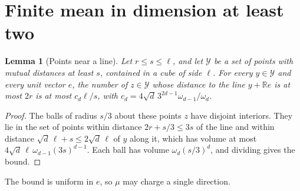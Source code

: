 \documentclass[11pt,a4paper]{article}
\numberwithin{equation}{section}
\newtheorem{lemma}[theorem]{Lemma}
\theoremstyle{definition}
\theoremstyle{remark}
\newcommand{\R}{\mathbb R}
\begin{document}
\section{Finite mean in dimension at least two}\label{sec:finite}

\begin{lemma}[Points near a line]\label{lem:tube}
Let $r\le s\le\ell$, and let $\mathcal Y$ be a set of points with mutual
distances at least $s$, contained in a cube of side $\ell$. For every
$y\in\mathcal Y$ and every unit vector $e$, the number of $z\in\mathcal Y$
whose distance to the line $y+\R e$ is at most $2r$ is at most $c_d\ell/s$,
with $c_d=4\sqrt d\,3^{2d-1}\omega_{d-1}/\omega_d$.
\end{lemma}

\begin{proof}
The balls of radius $s/3$ about these points $z$ have disjoint interiors.
They lie in the set of points within distance $2r+s/3\le3s$ of the line and
within distance $\sqrt d\,\ell+s\le2\sqrt d\,\ell$ of $y$ along it, which has
volume at most $4\sqrt d\,\ell\,\omega_{d-1}(3s)^{d-1}$. Each ball has volume
$\omega_d(s/3)^d$, and dividing gives the bound.
\end{proof}

The bound is uniform in $e$, so $\mu$ may charge a single direction.
\end{document}
